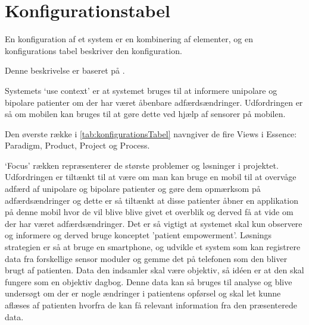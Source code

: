 \section{Konfigurationstabel}
En konfiguration af et system er en kombinering af elementer, og en konfigurations tabel beskriver den konfiguration.

Denne beskrivelse er baseret på  \citet[Afsnit 3.2]{art:essence}.

Systemets `use context' er at systemet bruges til at informere unipolare og bipolare patienter om der har været åbenbare adfærdsændringer. Udfordringen er så om mobilen kan bruges til at gøre dette ved hjælp af sensorer på mobilen.

Den øverste række i \cref{tab:konfigurationsTabel} navngiver de fire Views i Essence: Paradigm, Product, Project og Process.

`Focus' rækken repræsenterer de største problemer og løsninger i projektet. 
Udfordringen er tiltænkt til at være om man kan bruge en mobil til at overvåge adfærd af unipolare og bipolare patienter og gøre dem opmærksom på adfærdsændringer og dette er så tiltænkt at disse patienter åbner en applikation på denne mobil hvor de vil blive blive givet et overblik og derved få at vide om der har været adfærdsændringer. 
Det er så vigtigt at systemet skal kun observere og informere og derved bruge konceptet 'patient empowerment'.
Løsnings strategien er så at bruge en smartphone, og udvikle et system som kan registrere data fra forskellige sensor moduler og gemme det på telefonen som den bliver brugt af patienten.
Data den indsamler skal være objektiv, så idéen er at den skal fungere som en objektiv dagbog.
Denne data kan så bruges til analyse og blive undersøgt om der er nogle ændringer i patientens opførsel og skal let kunne aflæses af patienten hvorfra de kan få relevant information fra den præsenterede data. 

